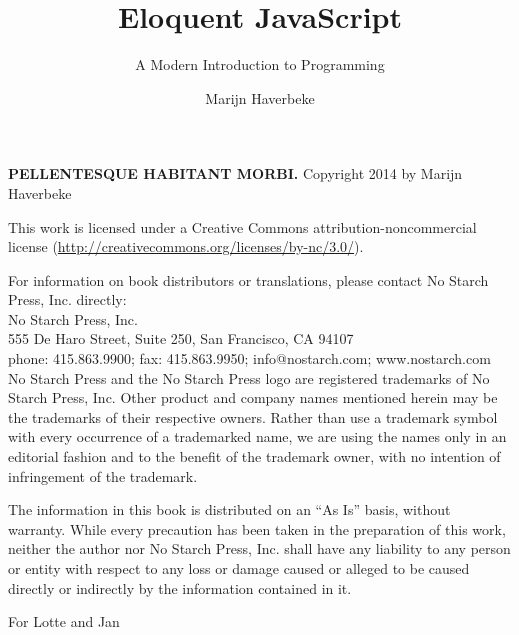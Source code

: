 \documentclass[cfonts]{nostarch}
\begin{document}
\frontmatter

\author{Marijn Haverbeke}

\title{Eloquent JavaScript}

\subtitle{A Modern Introduction to Programming}

\makehalftitle

\maketitle

\begin{copyrightpage}
  \textbf{\sffamily\MakeUppercase{Pellentesque habitant morbi.}}
  Copyright \textcopyright{} 2014 by Marijn Haverbeke

  This work is licensed under a Creative Commons
  attribution-noncommercial license
  (\url{http://creativecommons.org/licenses/by-nc/3.0/}).

For information on book distributors or translations, please contact
No Starch Press, Inc. directly: \\
No Starch Press, Inc.\\
555 De Haro Street, Suite 250, San Francisco, CA 94107\\
phone: 415.863.9900; fax: 415.863.9950; info@nostarch.com; www.nostarch.com\\

No Starch Press and the No Starch Press logo are registered trademarks
of No Starch Press, Inc. Other product and company names mentioned
herein may be the trademarks of their respective owners. Rather than
use a trademark symbol with every occurrence of a trademarked name, we
are using the names only in an editorial fashion and to the benefit of
the trademark owner, with no intention of infringement of the
trademark.

The information in this book is distributed on an ``As Is'' basis,
without warranty. While every precaution has been taken in the
preparation of this work, neither the author nor No Starch Press, Inc.
shall have any liability to any person or entity with respect to any
loss or damage caused or alleged to be caused directly or indirectly
by the information contained in it.

\end{copyrightpage}

\begin{dedicationpage}
For Lotte and Jan
\end{dedicationpage}

\brieftableofcontents
\end{document}
